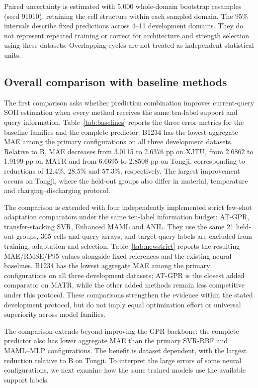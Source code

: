 \documentclass[preprint,12pt]{elsarticle}
\begin{document}
Paired uncertainty is estimated with 5,000 whole-domain bootstrap resamples (seed 91010), retaining the cell structure within each sampled domain. The 95\% intervals describe fixed predictions across 4--11 development domains. They do not represent repeated training or correct for architecture and strength selection using these datasets. Overlapping cycles are not treated as independent statistical units.

\subsection{Overall comparison with baseline methods}
\label{sec:baselines}
The first comparison asks whether prediction combination improves current-query SOH estimation when every method receives the same ten-label support and query information. Table~\ref{tab:baselines} reports the three error metrics for the baseline families and the complete predictor. B1234 has the lowest aggregate MAE among the primary configurations on all three development datasets. Relative to B, MAE decreases from 3.0115 to 2.6376 pp on XJTU, from 2.6862 to 1.9199 pp on MATR and from 6.6695 to 2.8508 pp on Tongji, corresponding to reductions of 12.4\%, 28.5\% and 57.3\%, respectively. The largest improvement occurs on Tongji, where the held-out groups also differ in material, temperature and charging--discharging protocol.



The comparison is extended with four independently implemented strict few-shot adaptation comparators under the same ten-label information budget: AT-GPR, transfer-stacking SVR, Enhanced MAML and ANIL. They use the same 21 held-out groups, 365 cells and query arrays, and target query labels are excluded from training, adaptation and selection. Table~\ref{tab:newstrict} reports the resulting MAE/RMSE/P95 values alongside fixed references and the existing neural baselines. B1234 has the lowest aggregate MAE among the primary configurations on all three development datasets; AT-GPR is the closest added comparator on MATR, while the other added methods remain less competitive under this protocol. These comparisons strengthen the evidence within the stated development protocol, but do not imply equal optimization effort or universal superiority across model families.



The comparison extends beyond improving the GPR backbone: the complete predictor also has lower aggregate MAE than the primary SVR-RBF and MAML--MLP configurations. The benefit is dataset dependent, with the largest reduction relative to B on Tongji. To interpret the large errors of some neural configurations, we next examine how the same trained models use the available support labels.
\end{document}
